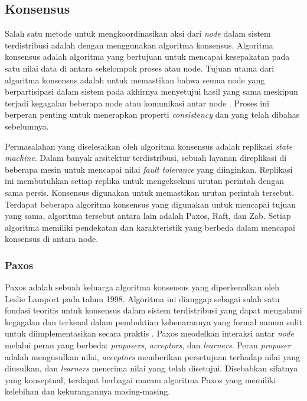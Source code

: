 \subsection{Konsensus}
\label{subsection:konsensus}

Salah satu metode untuk mengkoordinasikan aksi dari \textit{node} dalam sistem terdistribusi adalah dengan menggunakan algoritma konsensus. Algoritma konsensus adalah algoritma yang bertujuan untuk mencapai kesepakatan pada satu nilai data di antara sekelompok proses atau node. Tujuan utama dari algoritma konsensus adalah untuk memastikan bahwa semua node yang berpartisipasi dalam sistem pada akhirnya menyetujui hasil yang sama meskipun terjadi kegagalan beberapa node atau komunikasi antar node \parencite{coulouris2012distributed}. Proses ini berperan penting untuk menerapkan properti \textit{consistency} dan yang telah dibahas sebelumnya.

Permasalahan yang diselesaikan oleh algoritma konsensus adalah replikasi \textit{state machine}. Dalam banyak arsitektur terdistribusi, sebuah layanan direplikasi di beberapa mesin untuk mencapai nilai \textit{fault tolerance} yang diinginkan. Replikasi ini membutuhkan setiap replika untuk mengeksekusi urutan perintah dengan sama persis. Konsensus digunakan untuk memastikan urutan perintah tersebut. Terdapat beberapa algoritma konsensus yang digunakan untuk mencapai tujuan yang sama, algoritma tersebut antara lain adalah Paxos, Raft, dan Zab. Setiap algoritma memiliki pendekatan dan karakteristik yang berbeda dalam mencapai konsensus di antara node.

\subsubsection{Paxos}

Paxos adalah sebuah keluarga algoritma konsensus yang diperkenalkan oleh Leslie Lamport pada tahun 1998. Algoritma ini dianggap sebagai salah satu fondasi teoritis untuk konsensus dalam sistem terdistribusi yang dapat mengalami kegagalan dan terkenal dalam pembuktian kebenarannya yang formal namun sulit untuk diimplementasikan secara praktis \parencite{lamport1998part}. Paxos meodelkan interaksi antar \textit{node} melalui peran yang berbeda: \textit{proposers}, \textit{acceptors}, dan \textit{learners}. Peran \textit{proposer} adalah mengusulkan nilai, \textit{acceptors} memberikan persetujuan terhadap nilai yang diusulkan, dan \textit{learners} menerima nilai yang telah disetujui. Disebabkan sifatnya yang konseptual, terdapat berbagai macam algoritma Paxos yang memiliki kelebihan dan kekurangannya masing-masing.

